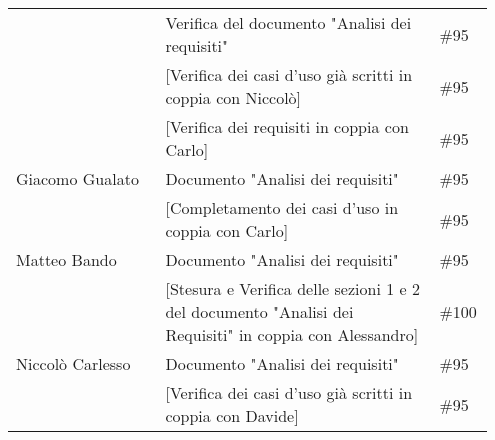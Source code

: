 \begin{center}
{\begin{tabular}{p{0.30\linewidth}|p{0.55\linewidth}|p{0.10\linewidth}}
			\cline{2-3}
			                                        & Verifica del documento "Analisi dei requisiti"                                                          & \#95          \\
			\cline{2-3}
			                                        & [Verifica dei casi d'uso già scritti in coppia con Niccolò]                                             & \#95          \\
			\cline{2-3}
			                                        & [Verifica dei requisiti in coppia con Carlo]                                                            & \#95          \\ \hline
			Giacomo Gualato                         & Documento "Analisi dei requisiti"                                                                       & \#95          \\
			\cline{2-3}
			                                        & [Completamento dei casi d'uso in coppia con Carlo]                                                      & \#95          \\
			\hline
			Matteo Bando                            & Documento "Analisi dei requisiti"                                                                       & \#95          \\
			\cline{2-3}
			                                        & [Stesura e Verifica delle sezioni 1 e 2 del documento "Analisi dei Requisiti" in coppia con Alessandro] & \#100         \\
			\hline
			Niccolò Carlesso                        & Documento "Analisi dei requisiti"                                                                       & \#95          \\
			\cline{2-3}
			                                        & [Verifica dei casi d'uso già scritti in coppia con Davide]                                              & \#95          \\
			\hline
		\end{tabular}
	}
\end{center}
